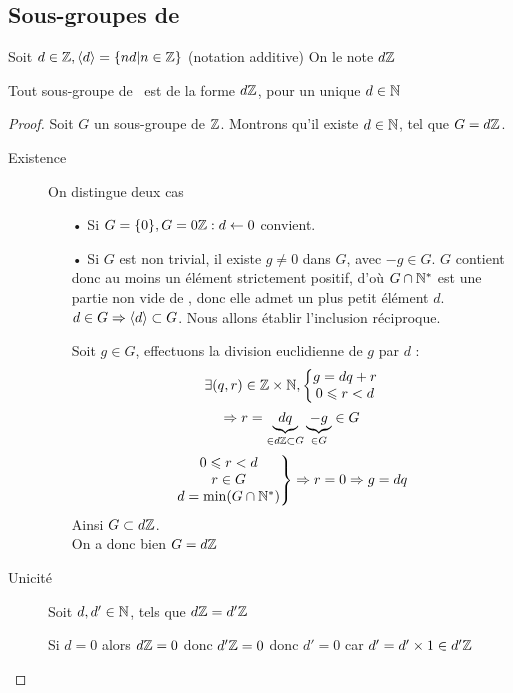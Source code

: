 \documentclass[12pt,a4paper,final]{article}
\begin{document}
		\subsection{Sous-groupes de \Z}
			Soit $d\in\mathbb{Z}, \langle d\rangle=\{nd|n\in\mathbb{Z}\}$ (notation additive) On le note $d\mathbb{Z}$
		\begin{theorem}
			Tout sous-groupe de \Z~est de la forme $d\mathbb{Z}$, pour un unique $d\in\mathbb{N}$
		\end{theorem}
		\begin{proof}
			Soit $G$ un sous-groupe de $\mathbb{Z}$. Montrons qu'il existe $d\in\mathbb{N}$, tel que $G=d\mathbb{Z}$.
			\begin{description}
				\item[Existence] On distingue deux cas
				\begin{itemize}
					\item[•] Si $G=\{0\}, G=0\mathbb{Z} : d\leftarrow0$ convient.
					\item[•] Si $G$ est non trivial, il existe $g\neq0$ dans $G$, avec $-g\in G$.
						$G$ contient donc au moins un \'el\'ement strictement positif, d'o\`u
						$G\cap\mathbb{N}^*$  est une partie non vide de \N, donc elle admet un plus petit \'el\'ement $d$.
						$d\in G \Rightarrow \langle d\rangle\subset G$. Nous allons \'etablir l'inclusion r\'eciproque.

						Soit $g\in G$, effectuons la division euclidienne de $g$ par $d$ :
						\[  \exists(q,r)\in\mathbb{Z}\times\mathbb{N},\left\{\begin{matrix}g = d q + r\\0\leqslant r < d\end{matrix}\right.  \]
						\[ \Rightarrow r = \underbrace{dq}_{\in d\mathbb{Z} \subset G}  \underbrace{-g}_{\in G} \in G \]
						\[ \left. \begin{matrix}
								0 \leqslant r < d \\
								r \in G \\
								d=\min ( G \cap \mathbb{N}^* )
							\end{matrix} \right\}
							\Rightarrow r = 0 \Rightarrow g = dq
						\]
						Ainsi $G \subset d\mathbb{Z}$. \\
						On a donc bien $G=d\mathbb{Z}$
				\end{itemize}
				\item[Unicit\'e]
					Soit $d,d'\in\mathbb{N}$, tels que $d\mathbb{Z}=d'\mathbb{Z}$
					\begin{itemize}
						Si $d=0$ alors $d\mathbb{Z}=0$ donc $d'\mathbb{Z}=0$ donc $d'=0$ car $d'=d'\times1\in d'\mathbb{Z}$
					\end{itemize}
			\end{description}
		\end{proof}
		
\end{document}
